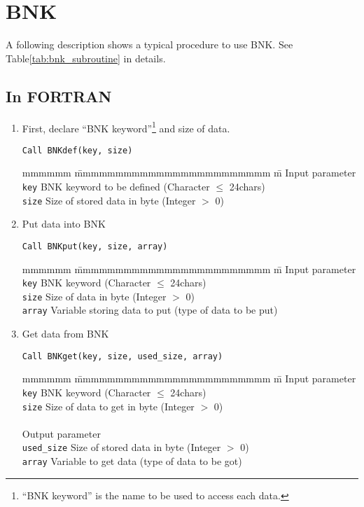 \chapter{BNK}

A following description shows a typical procedure to use BNK.
See Table\ref{tab:bnk_subroutine} in details.

\section{In FORTRAN}
\begin{enumerate}
\item First, declare ``BNK keyword''\footnote{
``BNK keyword'' is the name to be used to access each data.}
and size of data.

\begin{verbatim}
Call BNKdef(key, size)
\end{verbatim}
\begin{tabbing} mmmmmm \= mmmmmmmmmmmmmmmmmmmmmmmm \= m \kill
Input parameter \\
{\tt key}	\> BNK keyword to be defined	\> (Character $\leq$ 24chars)\\
{\tt size}	\> Size of stored data in byte	\> (Integer $>$ 0)
\end {tabbing}

\item Put data into BNK

\begin{verbatim}
Call BNKput(key, size, array)
\end{verbatim}
\begin{tabbing} mmmmmm \= mmmmmmmmmmmmmmmmmmmmmmmm \= m \kill
Input parameter \\
{\tt key}	\> BNK keyword			\> (Character $\leq$ 24chars)\\
{\tt size}	\> Size of data in byte		\> (Integer $>$ 0) \\
{\tt array}	\> Variable storing data to put	\> (type of data to be put)
\end {tabbing}

\item Get data from BNK

\begin{verbatim}
Call BNKget(key, size, used_size, array)
\end{verbatim}
\begin{tabbing} mmmmmm \= mmmmmmmmmmmmmmmmmmmmmmmm \= m \kill
Input parameter \\
{\tt key}	\> BNK keyword			\> (Character $\leq$ 24chars)\\
{\tt size}	\> Size of data to get in byte	\> (Integer $>$ 0) \\
\smallskip \\
Output parameter \\
{\tt used\_size}\> Size of stored data in byte	\> (Integer $>$ 0) \\
{\tt array}	\> Variable to get data		\> (type of data to be got)
\end {tabbing}

\end{enumerate}

